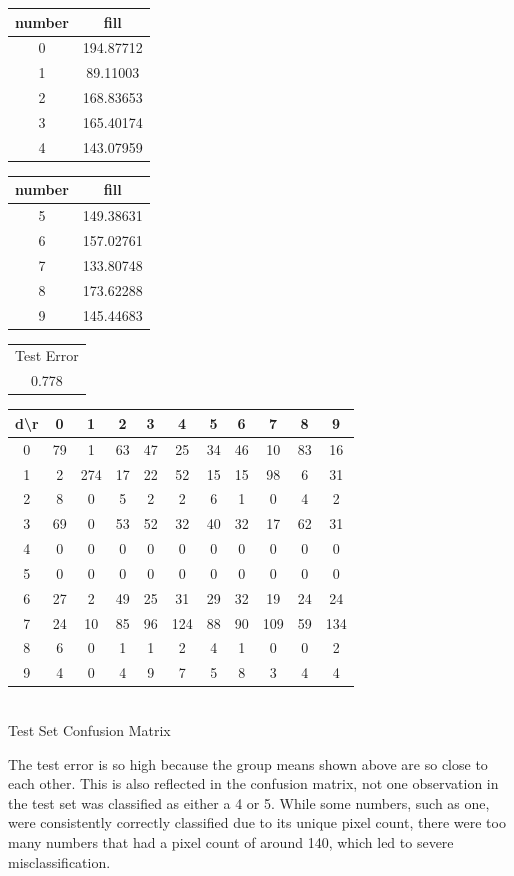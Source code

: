 \documentclass[10pt]{extarticle}
\begin{document}
\begin{minipage}{.45\textwidth}
\begin{center}
\begin{minipage}{.45\textwidth}
	\begin{tabular}{c c}
	number & fill\\ \hline
	0& 194.87712\\
	1&  89.11003\\
	2& 168.83653\\
	3& 165.40174\\
	4& 143.07959
	\end{tabular}
\end{minipage}
\begin{minipage}{.45\textwidth}
	\begin{tabular}{c c}
	number & fill\\ \hline
	5& 149.38631\\
	6& 157.02761\\
	7& 133.80748\\
	8& 173.62288\\
	9& 145.44683
	\end{tabular}
\end{minipage}
\begin{tabular}{c}
	Test Error\\
	0.778
\end{tabular}
\end{center}
\end{minipage}
\begin{minipage}{.6\textwidth}
	\begin{center}
	\begin{tabular}{c | c c c c c c c c c c}
	d\textbackslash r&0&1&2&3&4&5&6&7&8&9\\ \hline
	0&79&1&63&47&25&34&46&10&83&16\\
	1&2&274&17&22&52&15&15&98&6&31\\
	2&8&0&5&2&2&6&1&0&4&2\\
	3&69&0&53&52&32&40&32&17&62&31\\
	4&0&0&0&0&0&0&0&0&0&0\\
	5&0&0&0&0&0&0&0&0&0&0\\
	6&27&2&49&25&31&29&32&19&24&24\\
	7&24&10&85&96&124&88&90&109&59&134\\
	8&6&0&1&1&2&4&1&0&0&2\\
	9&4&0&4&9&7&5&8&3&4&4
	\end{tabular}\\
	\bigskip
	Test Set Confusion Matrix
	\end{center}
	\textrm{ }
\end{minipage}
The test error is so high because the group means shown above are so close to each other. This is also reflected in the confusion matrix, not one observation in the test set was classified as either a 4 or 5. While some numbers, such as one, were consistently correctly classified due to its unique pixel count, there were too many numbers that had a pixel count of around 140, which led to severe misclassification.
\end{document}
